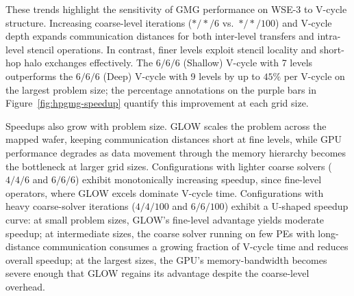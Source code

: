 \documentclass[conference]{IEEEtran}
\begin{document}
            These trends highlight the sensitivity of GMG performance on WSE-3 to V-cycle structure. Increasing coarse-level iterations ($*/*/6$ vs.\ $*/*/100$) and V-cycle depth expands communication distances for both inter-level transfers and intra-level stencil operations. In contrast, finer levels exploit stencil locality and short-hop halo exchanges effectively. The $6/6/6$ (Shallow) V-cycle with 7 levels outperforms the $6/6/6$ (Deep) V-cycle with 9 levels by up to $45\%$ per V-cycle on the largest problem size; the percentage annotations on the purple bars in Figure~\ref{fig:hpgmg-speedup} quantify this improvement at each grid size.

            Speedups also grow with problem size. GLOW scales the problem across the mapped wafer, keeping communication distances short at fine levels, while GPU performance degrades as data movement through the memory hierarchy becomes the bottleneck at larger grid sizes. Configurations with lighter coarse solvers ($4/4/6$ and $6/6/6$) exhibit monotonically increasing speedup, since fine-level operators, where GLOW excels dominate V-cycle time. Configurations with heavy coarse-solver iterations ($4/4/100$ and $6/6/100$) exhibit a U-shaped speedup curve: at small problem sizes, GLOW's fine-level advantage yields moderate speedup; at intermediate sizes, the coarse solver running on few PEs with long-distance communication consumes a growing fraction of V-cycle time and reduces overall speedup; at the largest sizes, the GPU's memory-bandwidth becomes severe enough that GLOW regains its advantage despite the coarse-level overhead.
\end{document}
